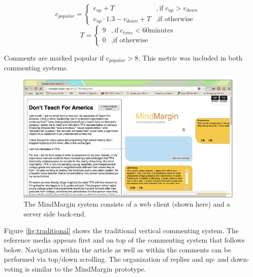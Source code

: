 \begin{displaymath}
   c_{popular} = 
     \begin{cases}
     v_{up} + T &, \text{if}~v_{up} > v_{down}\\
     v_{up} \cdot 1.3 - v_{down} + T &, \text{if otherwise}
	\end{cases}
\end{displaymath} 
\begin{displaymath}	
	T = 
		\begin{cases}
		9 &, \text{if}~c_{time} < 60 \text{minutes}\\
		0 &, \text{if otherwise}
		\end{cases}
\end{displaymath} 

Comments are marked popular if $c_{popular} > 8$. This metric was included in both commenting systems.
   
\begin{figure}
\centering
\includegraphics[scale=0.3]{mindmargin.png} 
\caption{The MindMargin system consists of a web client (shown here) and a server side back-end.}
\label{fig:frontend}
\end{figure}

Figure \ref{fig:traditional} shows the traditional vertical commenting system. The reference media appears first and on top of the commenting system that follows below. Navigation within the article as well as within the comments can be performed via top/down scrolling. The organization of replies and up- and down-voting is similar to the MindMargin prototype.

